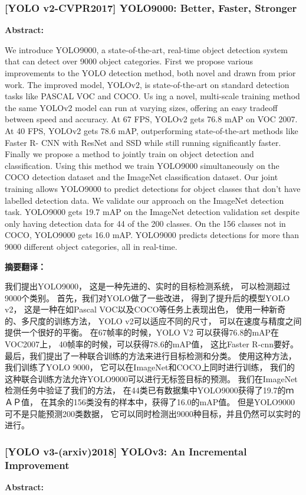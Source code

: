 \documentclass[a4paper, notitlepage]{article}
\begin{document}
\subsubsection{[YOLO v2-CVPR2017] YOLO9000: Better, Faster, Stronger}
\textbf{Abstract:}

We introduce YOLO9000, a state-of-the-art, real-time
object detection system that can detect over 9000 object
categories. First we propose various improvements to the
YOLO detection method, both novel and drawn from prior
work. The improved model, YOLOv2, is state-of-the-art on
standard detection tasks like PASCAL VOC and COCO. Us
ing a novel, multi-scale training method the same YOLOv2
model can run at varying sizes, offering an easy tradeoff
between speed and accuracy. At 67 FPS, YOLOv2 gets
76.8 mAP on VOC 2007. At 40 FPS, YOLOv2 gets 78.6
mAP, outperforming state-of-the-art methods like Faster R-
CNN with ResNet and SSD while still running significantly
faster. Finally we propose a method to jointly train on object detection and classification. Using this method we train
YOLO9000 simultaneously on the COCO detection dataset
and the ImageNet classification dataset. Our joint training
allows YOLO9000 to predict detections for object classes
that don’t have labelled detection data. We validate our
approach on the ImageNet detection task. YOLO9000 gets
19.7 mAP on the ImageNet detection validation set despite
only having detection data for 44 of the 200 classes. On
the 156 classes not in COCO, YOLO9000 gets 16.0 mAP.
YOLO9000 predicts detections for more than 9000 different
object categories, all in real-time.

\textbf{摘要翻译：}

我们提出YOLO9000，
这是一种先进的、实时的目标检测系统，
可以检测超过9000个类别。
首先，我们对YOLO做了一些改进，
得到了提升后的模型YOLO v2，
这是一种在如Pascal VOC以及COCO等任务上表现出色，
使用一种新奇的、多尺度的训练方法，
YOLO v2可以适应不同的尺寸，
可以在速度与精度之间提供一个很好的平衡。
在67帧率的时候，YOLO V2 可以获得76.8的mAP在VOC2007上，
40帧率的时候，可以获得78.6的mAP值，
这比Faster R-cnn要好。
最后，我们提出了一种联合训练的方法来进行目标检测和分类。
使用这种方法，我们训练了YOLO 9000，
它可以在ImageNet和COCO上同时进行训练，
我们的这种联合训练方法允许YOLO9000可以进行无标签目标的预测。
我们在ImageNet检测任务中验证了我们的方法，
在44类已有数据集中YOLO9000获得了19.7的ｍＡＰ值，
在其余的156类没有的样本中，获得了16.0的mAP值。
但是YOLO9000可不是只能预测200类数据，
它可以同时检测出9000种目标，并且仍然可以实时的进行。

\subsubsection{[YOLO v3-(arxiv)2018] YOLOv3: An Incremental Improvement}
\textbf{Abstract:}
\end{document}

